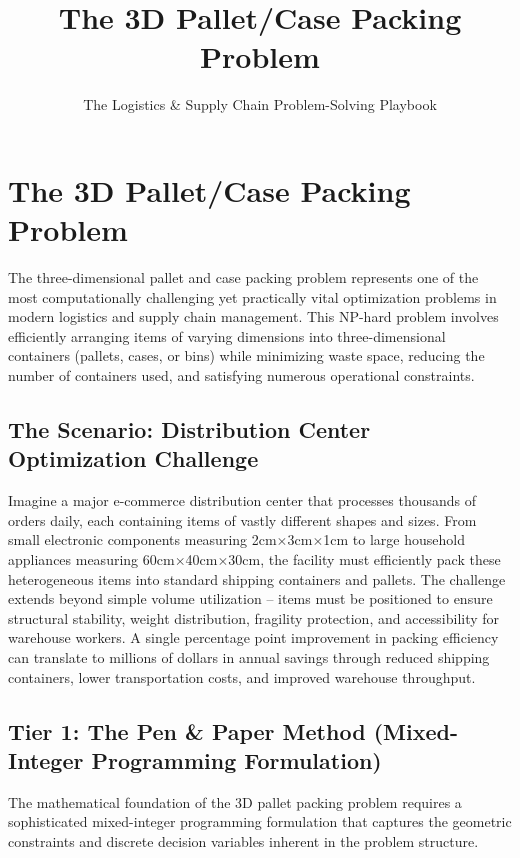 \documentclass{article}
\title{The 3D Pallet/Case Packing Problem}
\author{The Logistics \& Supply Chain Problem-Solving Playbook}
\date{}
\begin{document}
\maketitle

\section{The 3D Pallet/Case Packing Problem}

The three-dimensional pallet and case packing problem represents one of the most computationally challenging yet practically vital optimization problems in modern logistics and supply chain management. This NP-hard problem involves efficiently arranging items of varying dimensions into three-dimensional containers (pallets, cases, or bins) while minimizing waste space, reducing the number of containers used, and satisfying numerous operational constraints.

\subsection{The Scenario: Distribution Center Optimization Challenge}

Imagine a major e-commerce distribution center that processes thousands of orders daily, each containing items of vastly different shapes and sizes. From small electronic components measuring 2cm$\times$3cm$\times$1cm to large household appliances measuring 60cm$\times$40cm$\times$30cm, the facility must efficiently pack these heterogeneous items into standard shipping containers and pallets. The challenge extends beyond simple volume utilization -- items must be positioned to ensure structural stability, weight distribution, fragility protection, and accessibility for warehouse workers. A single percentage point improvement in packing efficiency can translate to millions of dollars in annual savings through reduced shipping containers, lower transportation costs, and improved warehouse throughput.

\subsection{Tier 1: The Pen \& Paper Method (Mixed-Integer Programming Formulation)}

The mathematical foundation of the 3D pallet packing problem requires a sophisticated mixed-integer programming formulation that captures the geometric constraints and discrete decision variables inherent in the problem structure.
\end{document}

